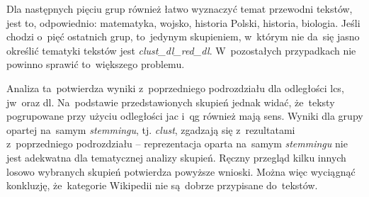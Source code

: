 \documentclass{praca1}
\begin{document}
Dla następnych pięciu grup również łatwo wyznaczyć temat przewodni tekstów, jest to, odpowiednio: matematyka, wojsko, historia Polski, historia, biologia. Jeśli chodzi o~pięć ostatnich grup, to~jedynym skupieniem, w~którym nie da~się jasno określić tematyki tekstów jest \emph{clust\_dl\_red\_dl}. W~pozostałych przypadkach nie powinno sprawić to~większego problemu.

Analiza ta~potwierdza wyniki z~poprzedniego podrozdziału dla odległości lcs, jw~oraz dl. Na~podstawie przedstawionych skupień jednak widać, że~teksty pogrupowane przy użyciu odległości jac i~qg również mają sens. Wyniki dla grupy opartej na~samym \emph{stemmingu}, tj. \emph{clust}, zgadzają się z~rezultatami z~poprzedniego podrozdziału -- reprezentacja oparta na~samym \emph{stemmingu} nie jest adekwatna dla tematycznej analizy skupień. Ręczny przegląd kilku innych losowo wybranych skupień potwierdza powyższe wnioski. Można więc wyciągnąć konkluzję, że~kategorie Wikipedii nie są~dobrze przypisane do~tekstów.
\end{document}
